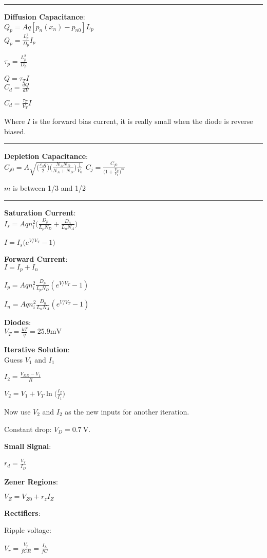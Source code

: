 \documentclass[a4paper]{article}
\begin{document}
\begin{multicols}{3}
\hrule 

\textbf{Diffusion Capacitance}:\\
$Q_p = Aq [p_n(x_n) - p_{n0}] L_p$\\
$Q_p = \frac{L_p^2}{D_p} I_p$

$\tau_p = \frac{L_p^2}{D_p}$

$Q = \tau_T I$\\
$C_d = \frac{dQ}{dV}$

$C_d = \frac{\tau_T}{V_T} I$

Where $I$ is the forward bias current, it is really
small when the diode is reverse biased.

\hrule

\textbf{Depletion Capacitance}:\\

$C_{j0} = A \sqrt{\Big( \frac{\varepsilon_s q}{2} \Big) \Big( \frac{N_A N_D}{N_A + N_D} \Big) \frac{1}{V_0}} $
$C_j = \frac{C_{j0}}{\Big( 1 + \frac{V_R}{V_0} \Big) ^ m}$

$m$ is between 1/3 and 1/2


\hrule

\textbf{Saturation Current}:\\

$I_s = Aq n_i^2 \Big( \frac{D_p}{L_p N_D} + \frac{D_n}{L_n N_A} \Big)$

$I = I_s \big( e^{V/V_T} - 1\big)$

\textbf{Forward Current}:\\

$I = I_p + I_n$

$I_p = A q n_i^2 \frac{D_p}{L_p N_D} (e ^ {V/V_T} - 1)$

$I_n = A q n_i^2 \frac{D_n}{L_n N_A} (e ^ {V/V_T} - 1)$

\textbf{Diodes}:\\

$V_T = \frac{kT}{q} = 25.9 \si{\mV}$

\textbf{Iterative Solution}: \\
Guess $V_1$ and $I_1$

$I_{2} = \frac{V_{DD} - V_1}{R}$

$V_2 = V_1 + V_T \ln \Big( \frac{I_2}{I_1} \Big)$

Now use $V_2$ and $I_2$ as the new inputs for another iteration.

Constant drop: $V_D = 0.7~\si{\V}$.

\textbf{Small Signal}:

$r_d = \frac{V_T}{I_D}$

\textbf{Zener Regions}:

$V_Z = V_{Z0} + r_z I_Z$

\textbf{Rectifiers}:

Ripple voltage:

$V_r = \frac{V_p}{fCR} = \frac{I_L}{fC}$




\end{multicols}
\end{document}
